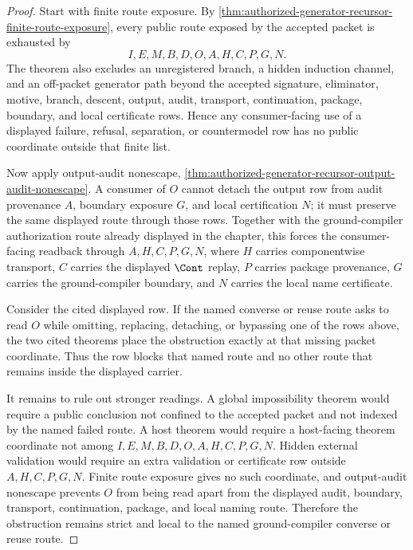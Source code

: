 \begin{proof}
Start with finite route exposure. By \autoref{thm:authorized-generator-recursor-finite-route-exposure}, every public route exposed by the accepted packet is exhausted by
$$
I,E,M,B,D,O,A,H,C,P,G,N.
$$
The theorem also excludes an unregistered branch, a hidden induction channel, and an off-packet generator path beyond the accepted signature, eliminator, motive, branch, descent, output, audit, transport, continuation, package, boundary, and local certificate rows. Hence any consumer-facing use of a displayed failure, refusal, separation, or countermodel row has no public coordinate outside that finite list.

Now apply output-audit nonescape, \autoref{thm:authorized-generator-recursor-output-audit-nonescape}. A consumer of $O$ cannot detach the output row from audit provenance $A$, boundary exposure $G$, and local certification $N$; it must preserve the same displayed route through those rows. Together with the ground-compiler authorization route already displayed in the chapter, this forces the consumer-facing readback through $A,H,C,P,G,N$, where $H$ carries componentwise transport, $C$ carries the displayed $\Cont$ replay, $P$ carries package provenance, $G$ carries the ground-compiler boundary, and $N$ carries the local name certificate.

Consider the cited displayed row. If the named converse or reuse route asks to read $O$ while omitting, replacing, detaching, or bypassing one of the rows above, the two cited theorems place the obstruction exactly at that missing packet coordinate. Thus the row blocks that named route and no other route that remains inside the displayed carrier.

It remains to rule out stronger readings. A global impossibility theorem would require a public conclusion not confined to the accepted packet and not indexed by the named failed route. A host theorem would require a host-facing theorem coordinate not among $I,E,M,B,D,O,A,H,C,P,G,N$. Hidden external validation would require an extra validation or certificate row outside $A,H,C,P,G,N$. Finite route exposure gives no such coordinate, and output-audit nonescape prevents $O$ from being read apart from the displayed audit, boundary, transport, continuation, package, and local naming route. Therefore the obstruction remains strict and local to the named ground-compiler converse or reuse route.
\end{proof}
